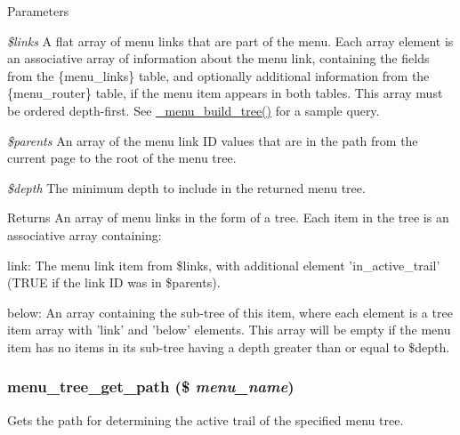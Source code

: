 \begin{DoxyParams}{Parameters}
\item[{\em \$links}]A flat array of menu links that are part of the menu. Each array element is an associative array of information about the menu link, containing the fields from the \{menu\_\-links\} table, and optionally additional information from the \{menu\_\-router\} table, if the menu item appears in both tables. This array must be ordered depth-\/first. See \hyperlink{group__menu_ga036009a003a68a01a420737d9c1b30c0}{\_\-menu\_\-build\_\-tree()} for a sample query. \item[{\em \$parents}]An array of the menu link ID values that are in the path from the current page to the root of the menu tree. \item[{\em \$depth}]The minimum depth to include in the returned menu tree.\end{DoxyParams}
\begin{DoxyReturn}{Returns}
An array of menu links in the form of a tree. Each item in the tree is an associative array containing:
\begin{DoxyItemize}
\item link: The menu link item from \$links, with additional element 'in\_\-active\_\-trail' (TRUE if the link ID was in \$parents).
\item below: An array containing the sub-\/tree of this item, where each element is a tree item array with 'link' and 'below' elements. This array will be empty if the menu item has no items in its sub-\/tree having a depth greater than or equal to \$depth. 
\end{DoxyItemize}
\end{DoxyReturn}
\hypertarget{group__menu_ga719b18e6d93314528b8726b333f300c0}{
\subsubsection[{menu\_\-tree\_\-get\_\-path}]{\setlength{\rightskip}{0pt plus 5cm}menu\_\-tree\_\-get\_\-path (\$ {\em menu\_\-name})}}
\label{group__menu_ga719b18e6d93314528b8726b333f300c0}
Gets the path for determining the active trail of the specified menu tree.


